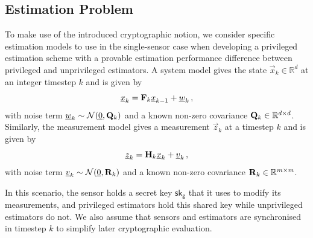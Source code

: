 % 
% 

\subsection{Estimation Problem}\label{subsec:priv_estimation:estimation_problem}
To make use of the introduced cryptographic notion, we consider specific estimation models to use in the single-sensor case when developing a privileged estimation scheme with a provable estimation performance difference between privileged and unprivileged estimators. A system model gives the state $\vec{x}_k\in\mathbb{R}^d$ at an integer timestep $k$ and is given by
\begin{equation}\label{eq:priv_estimation:system_model}
    {\underline{x}}_k = {{\mathbf{F}}}_k{\underline{x}}_{k-1} + {\underline{w}}_k\,,
\end{equation}
with noise term ${\underline{w}}_k\sim \mathcal{N}({\underline{0}}, {{\mathbf{Q}}}_k)$ and a known non-zero covariance ${{\mathbf{Q}}}_k\in \mathbb{R}^{d\times d}$. Similarly, the measurement model gives a measurement $\vec{z}_k$ at a timestep $k$ and is given by
\begin{equation}\label{eq:priv_estimation:single_sensor_measurement_model}
    {\underline{z}}_k = {{\mathbf{H}}}_k{\underline{x}}_k + {\underline{v}}_k\,,
\end{equation}
with noise term ${\underline{v}}_k\sim \mathcal{N}({\underline{0}}, {{\mathbf{R}}}_k)$ and a known non-zero covariance ${{\mathbf{R}}}_k\in \mathbb{R}^{m\times m}$.

In this scenario, the sensor holds a secret key $\mathsf{sk}_{\mathsf{g}}$ that it uses to modify its measurements, and privileged estimators hold this shared key while unprivileged estimators do not. We also assume that sensors and estimators are synchronised in timestep $k$ to simplify later cryptographic evaluation.

% 
% 

